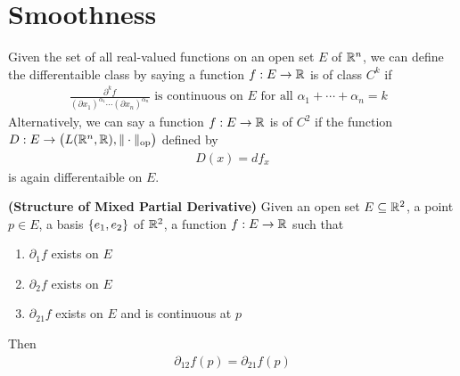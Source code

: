 \documentclass{report}
\begin{document}
\section{Smoothness}
\begin{mdframed}
Given the set of all real-valued functions on an open set $E$ of $\mathbb{R}^n$, we can define the differentaible class by saying a function $f:E\rightarrow \mathbb{R}$ is of class $C^k$ if 
\begin{align*}
\frac{\partial^kf}{(\partial x_1)^{\alpha_1}\cdots (\partial x_n)^{\alpha_n}}\text{ is continuous on $E$ for all $\alpha_1+\cdots + \alpha_n=k$  }
\end{align*}
Alternatively, we can say a function $f:E\rightarrow \mathbb{R}$ is of $C^2$ if the function $D:E\rightarrow \big(L(\mathbb{R}^n,\mathbb{R}),\| \cdot \|_\text{op} \big)$ defined by 
 \begin{align*}
D(x)=df_x
\end{align*}
is again differentaible on $E$. 
\end{mdframed}
\begin{theorem}
\label{SoMPD}
\textbf{(Structure of Mixed Partial Derivative)} Given an open set $E\subseteq \mathbb{R}^2$, a point $p\in  E$, a basis $\{ e_1,e_2 \}$ of $\mathbb{R}^2$, a function $f:E\rightarrow \mathbb{R}$ such that 
\begin{enumerate}[label=(\alph*)]
  \item $\partial_1 f$ exists on $E$
   \item $\partial_2 f$ exists on $E$
     \item $\partial_{21} f$ exists on $E$ and is continuous at $p$
\end{enumerate}
Then 
\begin{align*}
\partial_{12} f(p)=\partial_{21}f(p)
\end{align*}
\end{theorem}
\end{document}
